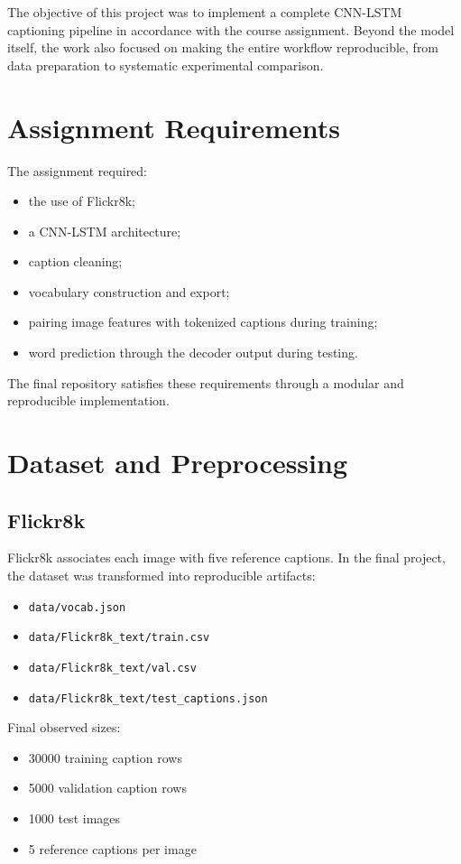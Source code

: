 \documentclass[11pt,a4paper]{article}
\begin{document}
The objective of this project was to implement a complete CNN-LSTM captioning pipeline in accordance with the course assignment. Beyond the model itself, the work also focused on making the entire workflow reproducible, from data preparation to systematic experimental comparison.

\section{Assignment Requirements}

The assignment required:
\begin{itemize}[leftmargin=*]
    \item the use of Flickr8k;
    \item a CNN-LSTM architecture;
    \item caption cleaning;
    \item vocabulary construction and export;
    \item pairing image features with tokenized captions during training;
    \item word prediction through the decoder output during testing.
\end{itemize}

The final repository satisfies these requirements through a modular and reproducible implementation.

\section{Dataset and Preprocessing}

\subsection{Flickr8k}

Flickr8k associates each image with five reference captions. In the final project, the dataset was transformed into reproducible artifacts:
\begin{itemize}[leftmargin=*]
    \item \texttt{data/vocab.json}
    \item \texttt{data/Flickr8k\_text/train.csv}
    \item \texttt{data/Flickr8k\_text/val.csv}
    \item \texttt{data/Flickr8k\_text/test\_captions.json}
\end{itemize}

Final observed sizes:
\begin{itemize}[leftmargin=*]
    \item 30000 training caption rows
    \item 5000 validation caption rows
    \item 1000 test images
    \item 5 reference captions per image
\end{itemize}
\end{document}
